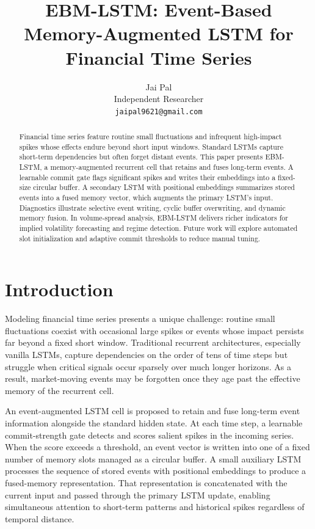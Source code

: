 \documentclass{article}
\title{EBM-LSTM: Event-Based Memory-Augmented LSTM for Financial Time Series}
\author{
	Jai Pal \\
	Independent Researcher \\
	\texttt{jaipal9621@gmail.com}
}
\begin{document}
	\maketitle
	
	\begin{abstract}
		Financial time series feature routine small fluctuations and infrequent high-impact spikes whose effects endure beyond short input windows. Standard LSTMs capture short-term dependencies but often forget distant events. This paper presents EBM-LSTM, a memory-augmented recurrent cell that retains and fuses long-term events. A learnable commit gate flags significant spikes and writes their embeddings into a fixed-size circular buffer. A secondary LSTM with positional embeddings summarizes stored events into a fused memory vector, which augments the primary LSTM’s input. Diagnostics illustrate selective event writing, cyclic buffer overwriting, and dynamic memory fusion. In volume-spread analysis, EBM-LSTM delivers richer indicators for implied volatility forecasting and regime detection. Future work will explore automated slot initialization and adaptive commit thresholds to reduce manual tuning.
	\end{abstract}
	
	
	
	
	\section{Introduction}
	Modeling financial time series presents a unique challenge: routine small fluctuations coexist with occasional large spikes or events whose impact persists far beyond a fixed short window. Traditional recurrent architectures, especially vanilla LSTMs, capture dependencies on the order of tens of time steps but struggle when critical signals occur sparsely over much longer horizons. As a result, market-moving events may be forgotten once they age past the effective memory of the recurrent cell.
	
	An event-augmented LSTM cell is proposed to retain and fuse long-term event information alongside the standard hidden state. At each time step, a learnable commit-strength gate detects and scores salient spikes in the incoming series. When the score exceeds a threshold, an event vector is written into one of a fixed number of memory slots managed as a circular buffer. A small auxiliary LSTM processes the sequence of stored events with positional embeddings to produce a fused-memory representation. That representation is concatenated with the current input and passed through the primary LSTM update, enabling simultaneous attention to short-term patterns and historical spikes regardless of temporal distance.
	
\end{document}

